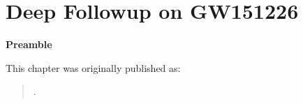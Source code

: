 \chapter[GW151226 Deep-Followup]{Deep Followup on GW151226}
\label{ch.deep}

\textbf{Preamble}

This chapter was originally published as:

\begin{quote}
.
\end{quote}



